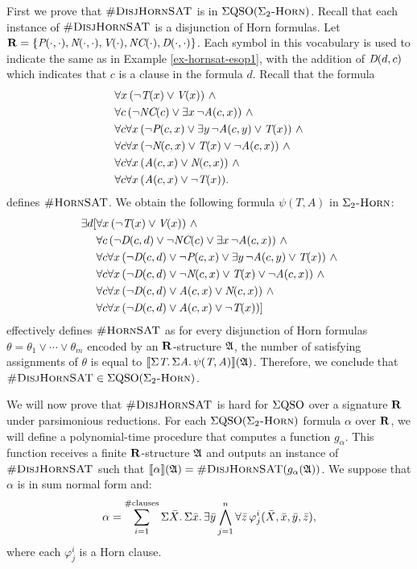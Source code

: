 First we prove that $\textsc{\#DisjHornSAT}$ is in $\Sigma{\rm QSO}(\Sigma_2\textsc{-Horn})$. Recall that each instance of $\textsc{\#DisjHornSAT}$ is a disjunction of Horn formulas. Let $\mathbf{R} = \{\textit{P}(\cdot,\cdot), \textit{N}(\cdot,\cdot), \textit{V}(\cdot), \textit{NC}(\cdot), \textit{D}(\cdot,\cdot)\}$. Each symbol in this vocabulary is used to indicate the same as in Example \ref{ex-hornsat-esop1}, with the addition of $\textit{D}(d,c)$ which indicates that $c$ is a clause in the formula $d$. Recall that the formula
\begin{align*}
&\forall x \, (\neg \pT(x) \vee \pV(x)) \ \wedge\\
&\forall c \, (\neg \textit{NC}(c) \vee \exists x \, \neg \textit{A}(c,x)) \ \wedge\\
&\forall c \forall x \, (\neg \textit{P}(c,x) \vee \exists y \, \neg \textit{A}(c,y) \vee \textit{T}(x)) \ \wedge\\
&\forall c \forall x \, (\neg \textit{N}(c,x) \vee \textit{T}(x) \vee \neg \textit{A}(c,x)) \ \wedge\\
&\forall c \forall x \, (\textit{A}(c,x) \vee \textit{N}(c,x)) \ \wedge\\
&\forall c \forall x \, (\textit{A}(c,x) \vee \neg\textit{T}(x)).
\end{align*}
defines $\textsc{\#HornSAT}$. We obtain the following formula $\psi(T,A)$ in $\Sigma_2\textsc{-Horn}$:
\begin{align*}
\exists d[&\forall x \, (\neg \textit{T}(x) \vee \textit{V}(x)) \ \wedge\\
&\forall c \, (\neg \textit{D}(c,d)\vee \neg \textit{NC}(c) \vee \exists x \, \neg \textit{A}(c,x)) \ \wedge\\
&\forall c \forall x \, (\neg \textit{D}(c,d)\vee\neg \textit{P}(c,x) \vee \exists y \, \neg \textit{A}(c,y) \vee \textit{T}(x)) \ \wedge\\
&\forall c \forall x \, (\neg \textit{D}(c,d)\vee\neg \textit{N}(c,x) \vee \textit{T}(x) \vee \neg \textit{A}(c,x)) \ \wedge\\
&\forall c \forall x \, (\neg \textit{D}(c,d)\vee\textit{A}(c,x) \vee \textit{N}(c,x)) \ \wedge\\
&\forall c \forall x \, (\neg \textit{D}(c,d)\vee\textit{A}(c,x) \vee \neg\textit{T}(x))]
\end{align*}
effectively defines $\textsc{\#HornSAT}$ as for every disjunction of Horn formulas $\theta = \theta_1\vee\cdots\vee\theta_m$ encoded by an $\mathbf{R}$-structure $\mathfrak{A}$, the number of satisfying assignments of $\theta$ is equal to ${\llbracket{}{\Sigma{\textit{T}}.\, \Sigma{\textit{A}}.\, \psi(\textit{T},\textit{A})}\rrbracket}(\mathfrak{A})$.  Therefore, we conclude that $\textsc{\#DisjHornSAT} \in \Sigma{\rm QSO}(\Sigma_2\textsc{-Horn})$.

\vspace{1em}
We will now prove that $\textsc{\#DisjHornSAT}$ is hard for $\Sigma{\rm QSO}$ over a signature $\mathbf{R}$ under parsimonious reductions. For each $\Sigma{\rm QSO}(\Sigma_2\textsc{-Horn})$ formula $\alpha$ over $\mathbf{R}$, we will define a polynomial-time procedure that computes a function $g_{\alpha}$. This function receives a finite $\mathbf{R}$-structure $\mathfrak{A}$ and outputs an instance of $\textsc{\#DisjHornSAT}$ such that ${\llbracket{}{\alpha}\rrbracket}(\mathfrak{A}) = \textsc{\#DisjHornSAT}(g_{\alpha}(\mathfrak{A}))$. We suppose that $\alpha$ is in sum normal form and:
$$
\alpha = \sum_{i = 1}^{\text{\#clauses}} \Sigma{\bar{X}}.\,\Sigma{\bar{x}}.\,\exists\bar{y}\bigwedge_{j = 1}^{n}\forall\bar{z}\,\varphi^i_j(\bar{X},\bar{x},\bar{y},\bar{z}),
$$
where each $\varphi^i_j$ is a Horn clause.                                                                

